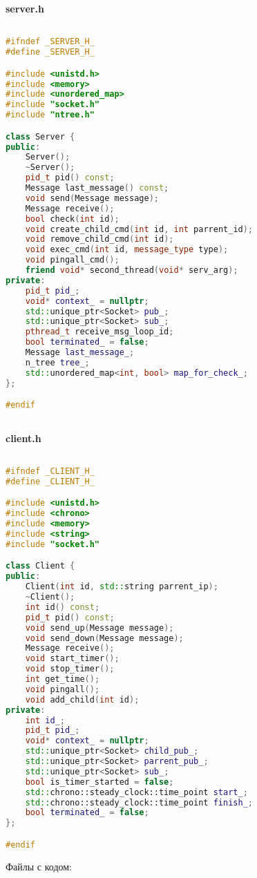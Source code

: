 \textbf{server.h}

\begin{lstlisting}[language=C++]

#ifndef _SERVER_H_
#define _SERVER_H_

#include <unistd.h>
#include <memory>
#include <unordered_map>
#include "socket.h"
#include "ntree.h"

class Server {
public:
    Server();
    ~Server();
    pid_t pid() const;
    Message last_message() const;
    void send(Message message);
    Message receive();
    bool check(int id);
    void create_child_cmd(int id, int parrent_id);
    void remove_child_cmd(int id);
    void exec_cmd(int id, message_type type);
    void pingall_cmd();
    friend void* second_thread(void* serv_arg);
private:
    pid_t pid_;
    void* context_ = nullptr;
    std::unique_ptr<Socket> pub_;
    std::unique_ptr<Socket> sub_;
    pthread_t receive_msg_loop_id;
    bool terminated_ = false;
    Message last_message_;
    n_tree tree_;
    std::unordered_map<int, bool> map_for_check_;
};

#endif



\end{lstlisting}

\textbf{client.h}

\begin{lstlisting}[language=C++]

#ifndef _CLIENT_H_
#define _CLIENT_H_

#include <unistd.h>
#include <chrono>
#include <memory>
#include <string>
#include "socket.h"

class Client {
public:
    Client(int id, std::string parrent_ip);
    ~Client();
    int id() const;
    pid_t pid() const;
    void send_up(Message message);
    void send_down(Message message);
    Message receive();
    void start_timer();
    void stop_timer();
    int get_time();
    void pingall();
    void add_child(int id);
private:
    int id_;
    pid_t pid_;
    void* context_ = nullptr;
    std::unique_ptr<Socket> child_pub_;
    std::unique_ptr<Socket> parrent_pub_;
    std::unique_ptr<Socket> sub_;
    bool is_timer_started = false;
    std::chrono::steady_clock::time_point start_;
    std::chrono::steady_clock::time_point finish_;
    bool terminated_ = false;
};

#endif

\end{lstlisting}

Файлы с кодом:

